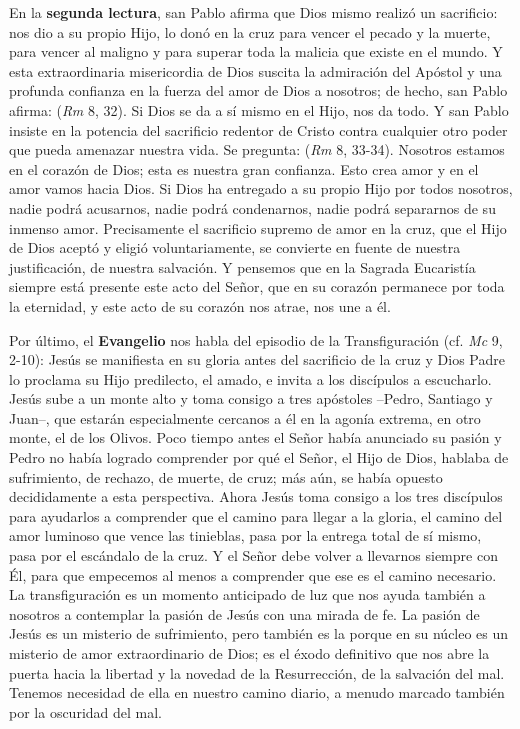 \begin{body}
En la \textbf{segunda lectura}, san Pablo afirma que Dios mismo realizó un sacrificio: nos dio a su propio Hijo, lo donó en la cruz para vencer el pecado y la muerte, para vencer al maligno y para superar toda la malicia que existe en el mundo. Y esta extraordinaria misericordia de Dios suscita la admiración del Apóstol y una profunda confianza en la fuerza del amor de Dios a nosotros; de hecho, san Pablo afirma:  (\textit{Rm} 8, 32). Si Dios se da a sí mismo en el Hijo, nos da todo. Y san Pablo insiste en la potencia del sacrificio redentor de Cristo contra cualquier otro poder que pueda amenazar nuestra vida. Se pregunta:  (\textit{Rm} 8, 33-34). Nosotros estamos en el corazón de Dios; esta es nuestra gran confianza. Esto crea amor y en el amor vamos hacia Dios. Si Dios ha entregado a su propio Hijo por todos nosotros, nadie podrá acusarnos, nadie podrá condenarnos, nadie podrá separarnos de su inmenso amor. Precisamente el sacrificio supremo de amor en la cruz, que el Hijo de Dios aceptó y eligió voluntariamente, se convierte en fuente de nuestra justificación, de nuestra salvación. Y pensemos que en la Sagrada Eucaristía siempre está presente este acto del Señor, que en su corazón permanece por toda la eternidad, y este acto de su corazón nos atrae, nos une a él.

Por último, el \textbf{Evangelio} nos habla del episodio de la Transfiguración (cf. \textit{Mc} 9, 2-10): Jesús se manifiesta en su gloria antes del sacrificio de la cruz y Dios Padre lo proclama su Hijo predilecto, el amado, e invita a los discípulos a escucharlo. Jesús sube a un monte alto y toma consigo a tres apóstoles –Pedro, Santiago y Juan–, que estarán especialmente cercanos a él en la agonía extrema, en otro monte, el de los Olivos. Poco tiempo antes el Señor había anunciado su pasión y Pedro no había logrado comprender por qué el Señor, el Hijo de Dios, hablaba de sufrimiento, de rechazo, de muerte, de cruz; más aún, se había opuesto decididamente a esta perspectiva. Ahora Jesús toma consigo a los tres discípulos para ayudarlos a comprender que el camino para llegar a la gloria, el camino del amor luminoso que vence las tinieblas, pasa por la entrega total de sí mismo, pasa por el escándalo de la cruz. Y el Señor debe volver a llevarnos siempre con Él, para que empecemos al menos a comprender que ese es el camino necesario. La transfiguración es un momento anticipado de luz que nos ayuda también a nosotros a contemplar la pasión de Jesús con una mirada de fe. La pasión de Jesús es un misterio de sufrimiento, pero también es la  porque en su núcleo es un misterio de amor extraordinario de Dios; es el éxodo definitivo que nos abre la puerta hacia la libertad y la novedad de la Resurrección, de la salvación del mal. Tenemos necesidad de ella en nuestro camino diario, a menudo marcado también por la oscuridad del mal.


\end{body}
